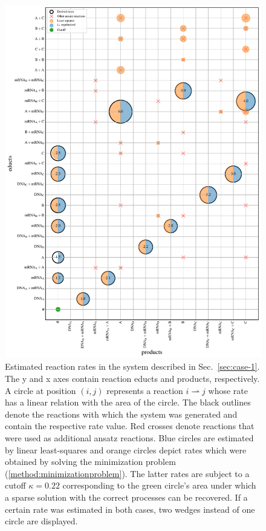 \documentclass[oneside, abstracton, titlepage]{scrartcl}
\begin{document}
	\begin{figure}
		\centering
		\includegraphics[width=.9\textwidth]{./figures_tex/sparsity_pattern}
		\caption{Estimated reaction rates in the system described in Sec.~\ref{sec:case-1}. The y and x axes contain reaction educts and products, respectively. A circle at position $(i,j)$ represents a reaction $i\rightharpoonup j$ whose rate has a linear relation with the area of the circle. The black outlines denote the reactions with which the system was generated and contain the respective rate value. Red crosses denote reactions that were used as additional ansatz reactions. Blue circles are estimated by linear least-squares and orange circles depict rates which were obtained by solving the minimization problem (\ref{method:minimizationproblem}). The latter rates are subject to a cutoff $\kappa=0.22$ corresponding to the green circle's area under which a sparse solution with the correct processes can be recovered. If a certain rate was estimated in both cases, two wedges instead of one circle are displayed.}
		\label{fig:case-1-sparsity-pattern}
	\end{figure}
\end{document}
